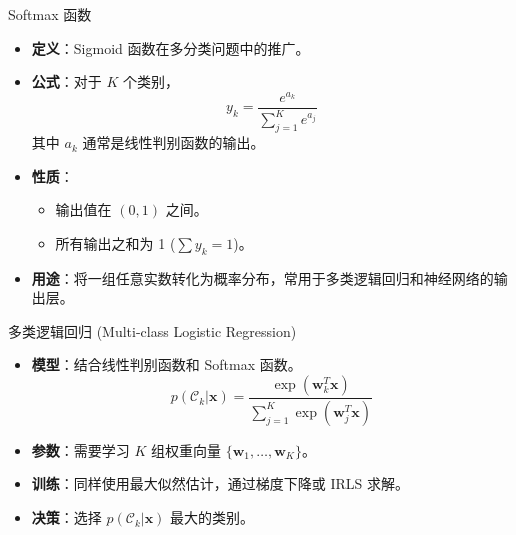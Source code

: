 \documentclass[12pt, aspectratio=169]{beamer}
\newcommand{\vect}[1]{\mathbf{#1}}
\begin{document}
\begin{frame}{Softmax 函数}
    \begin{itemize}
        \item \textbf{定义}：Sigmoid 函数在多分类问题中的推广。
        \item \textbf{公式}：对于 $K$ 个类别，
        $$ y_k = \frac{e^{a_k}}{\sum_{j=1}^K e^{a_j}} $$
        其中 $a_k$ 通常是线性判别函数的输出。
        \item \textbf{性质}：
        \begin{itemize}
            \item 输出值在 $(0, 1)$ 之间。
            \item 所有输出之和为 1 ($\sum y_k = 1$)。
        \end{itemize}
        \item \textbf{用途}：将一组任意实数转化为概率分布，常用于多类逻辑回归和神经网络的输出层。
    \end{itemize}
\end{frame}

\begin{frame}{多类逻辑回归 (Multi-class Logistic Regression)}
    \begin{itemize}
        \item \textbf{模型}：结合线性判别函数和 Softmax 函数。
        $$ p(\mathcal{C}_k|\vect{x}) = \frac{\exp(\vect{w}_k^T \vect{x})}{\sum_{j=1}^K \exp(\vect{w}_j^T \vect{x})} $$
        \item \textbf{参数}：需要学习 $K$ 组权重向量 $\{\vect{w}_1, \dots, \vect{w}_K\}$。
        \item \textbf{训练}：同样使用最大似然估计，通过梯度下降或 IRLS 求解。
        \item \textbf{决策}：选择 $p(\mathcal{C}_k|\vect{x})$ 最大的类别。
    \end{itemize}
\end{frame}
\end{document}
